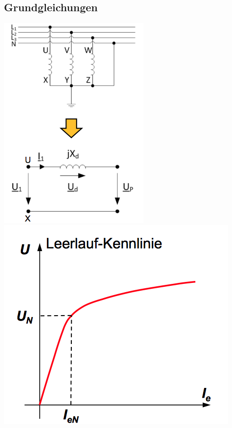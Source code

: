 \subsection{Grundgleichungen}
\begin{minipage}{0.4 \linewidth}
\includegraphics[width = \linewidth]{./Pics/VL1011/Grundgleichung}
\includegraphics[width = \linewidth]{./Pics/VL1011/leerlaufk}

\end{minipage}
